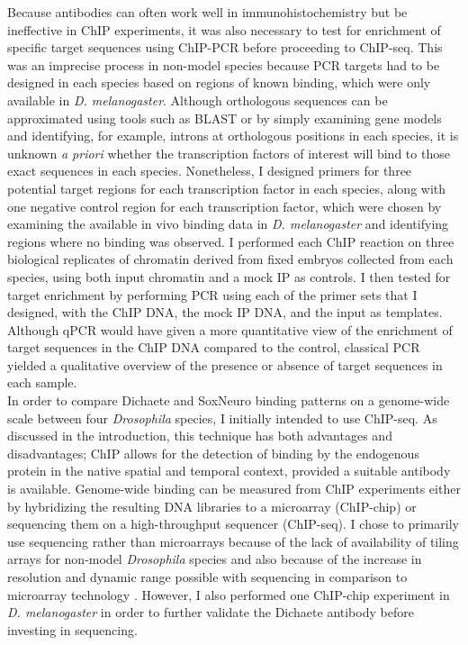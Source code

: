 Because antibodies can often work well in immunohistochemistry but be ineffective in ChIP experiments, it was also necessary to test for enrichment of specific target sequences using ChIP-PCR before proceeding to ChIP-seq. This was an imprecise process in non-model species because PCR targets had to be designed in each species based on regions of known binding, which were only available in \emph{D. melanogaster}. Although orthologous sequences can be approximated using tools such as BLAST \citep{altschul_basic_1990} or by simply examining gene models and identifying, for example, introns at orthologous positions in each species, it is unknown \emph{a priori} whether the transcription factors of interest will bind to those exact sequences in each species. Nonetheless, I designed primers for three potential target regions for each transcription factor in each species, along with one negative control region for each transcription factor, which were chosen by examining the available in vivo binding data in \emph{D. melanogaster} and identifying regions where no binding was observed. I performed each ChIP reaction on three biological replicates of chromatin derived from fixed embryos collected from each species, using both input chromatin and a mock IP as controls. I then tested for target enrichment by performing PCR using each of the primer sets that I designed, with the ChIP DNA, the mock IP DNA, and the input as templates. Although qPCR would have given a more quantitative view of the enrichment of target sequences in the ChIP DNA compared to the control, classical PCR yielded a qualitative overview of the presence or absence of target sequences in each sample.\\

In order to compare Dichaete and SoxNeuro binding patterns on a genome-wide scale between four \emph{Drosophila} species, I initially intended to use ChIP-seq. As discussed in the introduction, this technique has both advantages and disadvantages; ChIP allows for the detection of binding by the endogenous protein in the native spatial and temporal context, provided a suitable antibody is available. Genome-wide binding can be measured from ChIP experiments either by hybridizing the resulting DNA libraries to a microarray (ChIP-chip) or sequencing them on a high-throughput sequencer (ChIP-seq). I chose to primarily use sequencing rather than microarrays because of the lack of availability of tiling arrays for non-model \emph{Drosophila} species and also because of the increase in resolution and dynamic range possible with sequencing in comparison to microarray technology \citep{aleksic_chiping_2009}. However, I also performed one ChIP-chip experiment in \emph{D. melanogaster} in order to further validate the Dichaete antibody before investing in sequencing.\\

